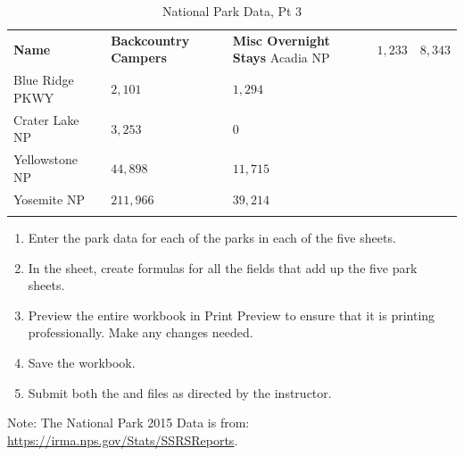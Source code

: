 \begin{table}[H]
	{\small
		\begin{longtable}{L{1.25in}L{0.60in}L{0.60in}} %
			\textbf{Name} & \textbf{Backcountry Campers} & \textbf{Misc Overnight Stays} \endhead
			\hline
			Acadia NP       & $ 1,233 $   & $ 8,343 $  \\
			Blue Ridge PKWY & $ 2,101 $   & $ 1,294 $  \\
			Crater Lake NP  & $ 3,253 $   & $ 0 $      \\
			Yellowstone NP  & $ 44,898 $  & $ 11,715 $ \\
			Yosemite NP     & $ 211,966 $ & $ 39,214 $ \\
			\caption{National Park Data, Pt 3}
			\label{06:tab07}
		\end{longtable}
	}
\end{table}

\begin{enumerate}[resume]
	\item Enter the park data for each of the parks in each of the five sheets.
	\item In the  sheet, create formulas for all the fields that add up the five park sheets.
	\item Preview the entire workbook in Print Preview to ensure that it is printing professionally. Make any changes needed.
	\item Save the  workbook.
	\item Submit both the  and  files as directed by the instructor.
\end{enumerate}

Note: The National Park 2015 Data is from: \url{https://irma.nps.gov/Stats/SSRSReports}.


